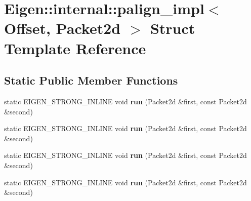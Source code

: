 \hypertarget{struct_eigen_1_1internal_1_1palign__impl_3_01_offset_00_01_packet2d_01_4}{}\section{Eigen\+:\+:internal\+:\+:palign\+\_\+impl$<$ Offset, Packet2d $>$ Struct Template Reference}
\label{struct_eigen_1_1internal_1_1palign__impl_3_01_offset_00_01_packet2d_01_4}
\subsection*{Static Public Member Functions}
\begin{DoxyCompactItemize}
\item 
\mbox{\label{struct_eigen_1_1internal_1_1palign__impl_3_01_offset_00_01_packet2d_01_4_a67e74f2cd50ad7d14d1820186da5f752}} 
static E\+I\+G\+E\+N\+\_\+\+S\+T\+R\+O\+N\+G\+\_\+\+I\+N\+L\+I\+NE void {\bfseries run} (Packet2d \&first, const Packet2d \&second)
\item 
\mbox{\label{struct_eigen_1_1internal_1_1palign__impl_3_01_offset_00_01_packet2d_01_4_a67e74f2cd50ad7d14d1820186da5f752}} 
static E\+I\+G\+E\+N\+\_\+\+S\+T\+R\+O\+N\+G\+\_\+\+I\+N\+L\+I\+NE void {\bfseries run} (Packet2d \&first, const Packet2d \&second)
\item 
\mbox{\label{struct_eigen_1_1internal_1_1palign__impl_3_01_offset_00_01_packet2d_01_4_a67e74f2cd50ad7d14d1820186da5f752}} 
static E\+I\+G\+E\+N\+\_\+\+S\+T\+R\+O\+N\+G\+\_\+\+I\+N\+L\+I\+NE void {\bfseries run} (Packet2d \&first, const Packet2d \&second)
\item 
\mbox{\label{struct_eigen_1_1internal_1_1palign__impl_3_01_offset_00_01_packet2d_01_4_a67e74f2cd50ad7d14d1820186da5f752}} 
static E\+I\+G\+E\+N\+\_\+\+S\+T\+R\+O\+N\+G\+\_\+\+I\+N\+L\+I\+NE void {\bfseries run} (Packet2d \&first, const Packet2d \&second)
\end{DoxyCompactItemize}


